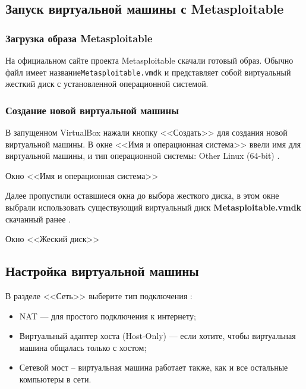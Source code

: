 \subsection{Запуск виртуальной машины с Metasploitable}

\subsubsection{Загрузка образа Metasploitable}

На официальном сайте проекта Metasploitable скачали готовый образ.
Обычно файл имеет название\texttt{Metasploitable.vmdk} 
и представляет собой виртуальный жесткий диск
с установленной операционной системой.

\subsubsection{Создание новой виртуальной машины}

В запущенном VirtualBox нажали кнопку <<Создать>>
для создания новой виртуальной машины.
В окне <<Имя и операционная система>> ввели имя для виртуальной машины,
и тип операционной системы: Other Linux (64-bit) .

\begin{image}
    \caption{Окно <<Имя и операционная система>>}
    \label{fig:name:os}
\end{image}

Далее пропустили оставшиеся окна до выбора жесткого диска,
в этом окне выбрали использовать существующий виртуальный диск
\textbf{Metasploitable.vmdk} скачанный ранее .

\begin{image}
    \caption{Окно <<Жеский диск>>}
    \label{fig:harddisk}
\end{image}

\subsection{Настройка виртуальной машины}

В разделе <<Сеть>> выберите тип подключения :

\begin{itemize}
	\item NAT --- для простого подключения к интернету;
	\item Виртуальный адаптер хоста (Host-Only) --- если хотите,
		чтобы виртуальная машина общалась только с хостом;
	\item Сетевой мост -- виртуальная машина работает также,
		как и все остальные компьютеры в сети.
\end{itemize}

